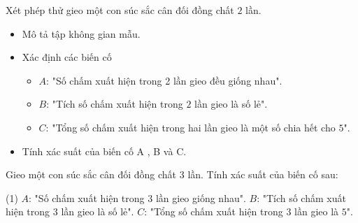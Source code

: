 \begin{vd}%
	Xét phép thử gieo một con súc sắc cân đối đồng chất $2$ lần.
	\begin{itemize}
		\item [a)] Mô tả tập không gian mẫu.
		\item [b)] Xác định các biến cố
		\begin{itemize}
			\item [$\bullet$] $A$: "Số chấm xuất hiện trong 2 lần gieo đều giống nhau".
			\item [$\bullet$] $B$: "Tích số chấm xuất hiện trong $2$ lần gieo là số lẻ".
			\item [$\bullet$] $C$: "Tổng số chấm xuất hiện trong hai lần gieo là một số chia hết cho $5$".
		\end{itemize} 
		\item [c)] Tính xác suất của biến cố A , B và C.
	\end{itemize}
	\loigiai{
	}
\end{vd} 
\begin{vd}%
	Gieo một con súc sắc cân đối đồng chất $3$ lần. Tính xác suất của biến cố sau:
	\begin{tasks}(1)
		\task $A$: "Số chấm xuất hiện trong $3$ lần gieo giống nhau".
		\task $B$: "Tích số chấm xuất hiện trong $3$ lần gieo là số lẻ".
		\task $C$: "Tổng số chấm xuất hiện trong $3$ lần gieo là $5$".
	\end{tasks}
\end{vd} 
